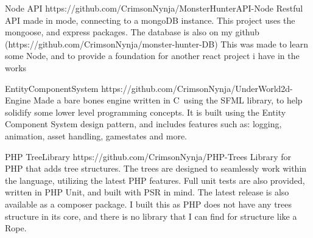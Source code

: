 \documentclass[9pt]{developercv}
\newcommand{\CC}{C\nolinebreak\hspace{-.05em}\raisebox{.4ex}{\tiny\bf +}\nolinebreak\hspace{-.10em}\raisebox{.4ex}{\tiny\bf +}}
\def\CC{{C\nolinebreak[4]\hspace{-.05em}\raisebox{.4ex}{\tiny\bf ++}}}
\begin{document}
\begin{minipage}[t]{0.7\textwidth}
		\begin{entrylist}	%
			\entry
				{Node API}
				{https://github.com/CrimsonNynja/MonsterHunterAPI-Node}
				{}
				{Restful API made in mode, connecting to a mongoDB instance. This project uses the mongoose, and express packages. The database is also on my github (https://github.com/CrimsonNynja/monster-hunter-DB) This was made to learn some Node, and to provide a foundation for another react project i have in the works}
		\end{entrylist}
		\begin{entrylist}	%
			\entry
				{Entity\newline Component\newline System}
				{https://github.com/CrimsonNynja/UnderWorld2d-Engine}
				{}
				{Made a bare bones engine written in \CC \ using the SFML library, to help solidify some lower level programming concepts. It is built using the Entity Component System design pattern, and includes features such as: logging, animation, asset handling, gamestates and more.}
		\end{entrylist}
		\begin{entrylist}	%
			\entry
				{PHP Tree\newline Library}
				{https://github.com/CrimsonNynja/PHP-Trees}
				{}
				{Library for PHP that adds tree structures. The trees are designed to seamlessly work within the language, utilizing the latest PHP features. Full unit tests are also provided, written in PHP Unit, and built with PSR in mind. The latest release is also available as a composer package. I built this as PHP does not have any trees structure in its core, and there is no library that I can find for structure like a Rope. }
		\end{entrylist}
	\end{minipage}
\begin{minipage}[t]{0.05\textwidth}
\hphantom{0.1}
\end{minipage}
\end{document}
